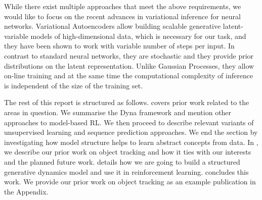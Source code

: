     While there exist multiple approaches that meet the above requirements, we would like to focus on the recent advances in variational inference for neural networks.
    Variational Autoencoders allow building scalable generative latent-variable models of high-dimensional data, which is necessary for our task, and they have been shown to work with variable number of steps per input.  In contrast to standard neural networks, they are stochastic and they provide prior distributions on the latent representation. Unlike Gaussian Processes, they allow on-line training and at the same time the computational complexity of inference is independent of the size of the training set. 

    The rest of this report is structured as follows.
     covers prior work related to the areas in question.
    We summarise the Dyna framework and mention other approaches to model-based RL. 
    We then proceed to describe relevant variants of unsupervised learning and sequence prediction approaches. We end the section by investigating how model structure helps to learn abstract concepts from data.
    In , we describe our prior work on object tracking and how it ties with our interests and the planned future work.
     details how we are going to build a structured generative dynamics model and use it in reinforcement learning.
     concludes this work. We provide our prior work on object tracking as an example publication in the Appendix.




